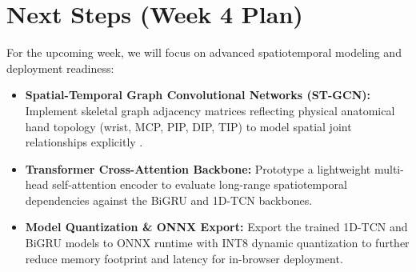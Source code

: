 \documentclass{article}
\begin{document}
\section*{Next Steps (Week 4 Plan)}
For the upcoming week, we will focus on advanced spatiotemporal modeling and deployment readiness:
\begin{itemize}
    \item \textbf{Spatial-Temporal Graph Convolutional Networks (ST-GCN):} Implement skeletal graph adjacency matrices reflecting physical anatomical hand topology (wrist, MCP, PIP, DIP, TIP) to model spatial joint relationships explicitly \cite{yan2018spatial}.
    \item \textbf{Transformer Cross-Attention Backbone:} Prototype a lightweight multi-head self-attention encoder to evaluate long-range spatiotemporal dependencies against the BiGRU and 1D-TCN backbones.
    \item \textbf{Model Quantization \& ONNX Export:} Export the trained 1D-TCN and BiGRU models to ONNX runtime with INT8 dynamic quantization to further reduce memory footprint and latency for in-browser deployment.
\end{itemize}
\end{document}
